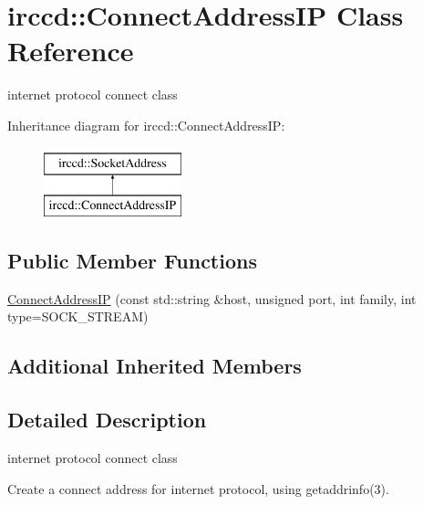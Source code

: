 \hypertarget{a00006}{\section{irccd\-:\-:Connect\-Address\-I\-P Class Reference}
\label{a00006}
}


internet protocol connect class  


Inheritance diagram for irccd\-:\-:Connect\-Address\-I\-P\-:\begin{figure}[H]
\begin{center}
\leavevmode
\includegraphics[height=2.000000cm]{a00006}
\end{center}
\end{figure}
\subsection*{Public Member Functions}
\begin{DoxyCompactItemize}
\item 
\hyperlink{a00006_a88d9af6b4f3503214d2234d8e787f4d5}{Connect\-Address\-I\-P} (const std\-::string \&host, unsigned port, int family, int type=S\-O\-C\-K\-\_\-\-S\-T\-R\-E\-A\-M)
\end{DoxyCompactItemize}
\subsection*{Additional Inherited Members}


\subsection{Detailed Description}
internet protocol connect class 

Create a connect address for internet protocol, using getaddrinfo(3). 

